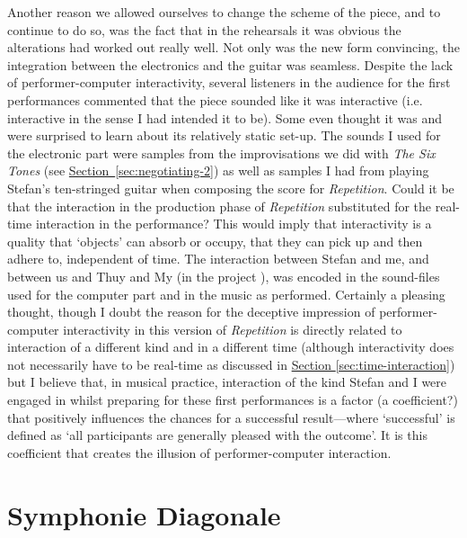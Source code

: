 %
\label{sec:3-par:4}
Another reason we allowed ourselves to change the scheme of the piece, and to continue to do so, was the fact that in the rehearsals it was obvious the alterations had worked out really well. Not only was the new form convincing, the integration between the electronics and the guitar was seamless. Despite the lack of performer-computer interactivity, several listeners in the audience for the first performances commented that the piece sounded like it was interactive (i.e. interactive in the sense I had intended it to be). Some even thought it was and were surprised to learn about its relatively static set-up. The sounds I used for the electronic part were samples from the improvisations we did with \emph{The Six Tones} (see \hyperref[sec:negotiating-2]{Section~\ref{sec:negotiating-2}}) as well as samples I had from playing Stefan's ten-stringed guitar when composing the score for \emph{Repetition}. Could it be that the interaction in the production phase of \emph{Repetition} substituted for the real-time interaction in the performance? This would imply that interactivity is a quality that `objects' can absorb or occupy, that they can pick up and then adhere to, independent of time. The interaction between Stefan and me, and between us and Thuy and My (in the project \emph{}), was encoded in the sound-files used for the computer part and in the music as performed. Certainly a pleasing thought, though I doubt the reason for the deceptive impression of performer-computer interactivity in this version of \emph{Repetition} is directly related to interaction of a different kind and in a different time (although interactivity does not necessarily have to be real-time as discussed in \hyperref[sec:time-interaction]{Section \ref*{sec:time-interaction}}) but I believe that, in musical practice, interaction of the kind Stefan and I were engaged in whilst preparing for these first performances is a factor (a coefficient?) that positively influences the chances for a successful result---where `successful' is defined as `all participants are generally pleased with the outcome'. It is this coefficient that creates the illusion of performer-computer interaction.


\section{Symphonie Diagonale}
\label{sec:negotiating-4}

